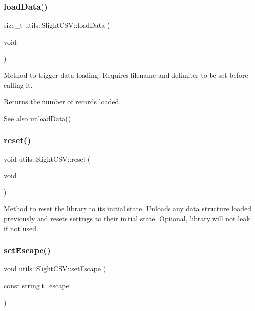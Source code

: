 \subsubsection{\texorpdfstring{load\+Data()}{loadData()}}
{\footnotesize\ttfamily size\+\_\+t utils\+::\+Slight\+C\+S\+V\+::load\+Data (\begin{DoxyParamCaption}\item[{void}]{ }\end{DoxyParamCaption})}

Method to trigger data loading. Requires filename and delimiter to be set before calling it. \begin{DoxyReturn}{Returns}
the number of records loaded. 
\end{DoxyReturn}
\begin{DoxySeeAlso}{See also}
\hyperlink{classutils_1_1SlightCSV_aaa9c8042d6231660cb08ada7c1a8dccb}{unload\+Data()} 
\end{DoxySeeAlso}
\mbox{\label{classutils_1_1SlightCSV_abc28f1e33cc67dd5d4380254070ecf97}} 
\subsubsection{\texorpdfstring{reset()}{reset()}}
{\footnotesize\ttfamily void utils\+::\+Slight\+C\+S\+V\+::reset (\begin{DoxyParamCaption}\item[{void}]{ }\end{DoxyParamCaption})}

Method to reset the library to its initial state. Unloads any data structure loaded previously and resets settings to their initial state. Optional, library will not leak if not used. \mbox{\label{classutils_1_1SlightCSV_adea39a71336eeacd17b66326deb92544}} 
\subsubsection{\texorpdfstring{set\+Escape()}{setEscape()}}
{\footnotesize\ttfamily void utils\+::\+Slight\+C\+S\+V\+::set\+Escape (\begin{DoxyParamCaption}\item[{const string}]{t\+\_\+escape }\end{DoxyParamCaption})}


